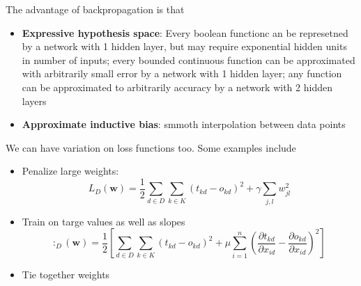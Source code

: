\documentclass[12pt]{article}
\theoremstyle{definition}
\begin{document}
The advantage of backpropagation is that 
\begin{itemize}
	\item \textbf{Expressive hypothesis space}: Every boolean functionc an be represetned by a network with 1 hidden layer, but may require exponential hidden units in number of inputs; every bounded continuous function can be approximated with arbitrarily small error by a network with 1 hidden layer; any function can be approximated to arbitrarily accuracy by a network with 2 hidden layers
	\item \textbf{Approximate inductive bias}: smmoth interpolation between data points
\end{itemize}
We can have variation on loss functions too. Some examples include
\begin{itemize}
	\item Penalize large weights:
	\[
L_D(\mathbf{w})=\frac{1}{2}\sum_{d\in D}\sum_{k\in K} (t_{kd}-o_{kd})^2 +\gamma \sum_{j, l} w_{jl}^2
	\]
	\item Train on targe values as well as slopes
	\[
:_D(\mathbf{w})=\frac{1}{2}\left[\sum_{d\in D}\sum_{k\in K} (t_{kd}-o_{kd})^2 + \mu\sum_{i=1}^n (\frac{\partial t_{kd}}{\partial x_{id}}-\frac{\partial o_{kd}}{\partial x_{id}})^2\right]
	\]
	\item Tie together weights
\end{itemize}
\clearpage
\end{document}
